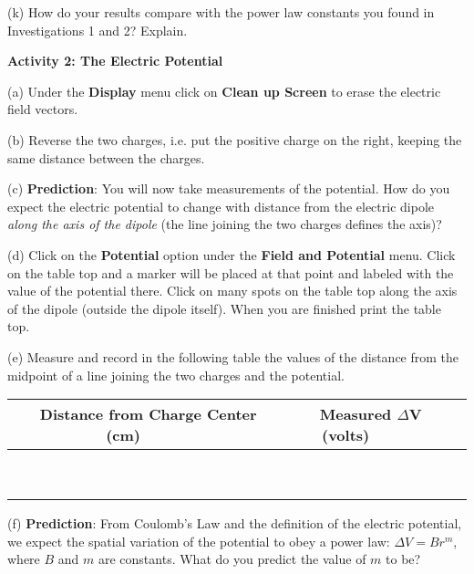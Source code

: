 (k) How do your results compare with the power law constants you found
in Investigations 1 and 2? Explain.\vspace{15mm}


\textbf{Activity 2: The Electric Potential}

(a) Under the {\bf Display} menu click on {\bf Clean up Screen} to erase the
electric field vectors.

(b) Reverse the two charges, i.e. put the positive charge on the right, keeping 
the same distance between the charges.

(c) \textbf{Prediction}: You will now take measurements of the potential.
How do you expect the electric potential to change with distance from the 
electric dipole \textit{along the axis of the dipole} (the line joining 
the two charges defines the axis)?
\vspace{15mm}
 
(d) Click on the \textbf{Potential} option under the \textbf{Field and Potential} menu. Click on the table top and a marker will be
placed at that point and labeled with the value of the potential there.
Click on many spots on the table top along the axis of the dipole (outside the dipole itself). When you are finished print the table top.
\vspace{15mm}

(e) Measure and record in the following table the values of the distance from 
the midpoint of a line joining the two charges and the potential.

\vspace{0.3cm}
{\centering \begin{tabular}{|c|c|c|}
\hline 
~~~Distance from Charge Center (cm)~~~&
~~~Measured \( \Delta  \)V (volts)~~~\\
\hline
\hline 
&
\\
\hline 
&
\\
\hline 
&
\\
\hline 
&
\\
\hline 
&
\\
\hline 
&
\\
\hline 
&
\\
\hline 
&
\\
\hline 
&
\\
\hline
\end{tabular}\par}
\vspace{0.3cm}


(f) \textbf{Prediction}: From Coulomb's Law and the definition of the
electric potential, we expect the spatial variation of the potential
to obey a power law: \( \Delta V=Br^{m} \), where \( B \)
and \( m \) are constants. What do you predict the value of \textbf{\( m \)}
to be?\vspace{15mm}


